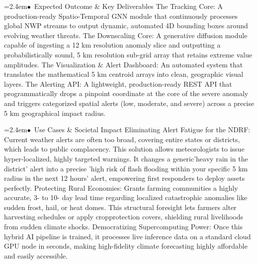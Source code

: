 \documentclass[10pt,a4paper]{article}
\begin{document}
\begin{tcolorbox}[pscard, title={"\textbf{SIH26078} \quad $\vert$ \quad AI-Driven Spatio-Temporal Tracking of Extreme Weather Anomalies in Medium-R...}]
\noindent\hspace*{1.2em}\hangindent=2.4em\textcolor{sihblue}{$\bullet$}~\small Expected Outcome \& Key Deliverables The Tracking Core: A production-ready Spatio-Temporal GNN module that continuously processes global NWP streams to output dynamic, automated 4D bounding boxes around evolving weather threats. The Downscaling Core: A generative diffusion module capable of ingesting a 12 km resolution anomaly slice and outputting a probabilistically sound, 5 km resolution sub-grid array that retains extreme value amplitudes. The Visualization \& Alert Dashboard: An automated system that translates the mathematical 5 km centroid arrays into clean, geographic visual layers. The Alerting API: A lightweight, production-ready REST API that programmatically drops a pinpoint coordinate at the core of the severe anomaly and triggers categorized spatial alerts (low, moderate, and severe) across a precise 5 km geographical impact radius.\par\vspace{0.05cm}
\noindent\hspace*{1.2em}\hangindent=2.4em\textcolor{sihblue}{$\bullet$}~\small Use Cases \& Societal Impact Eliminating Alert Fatigue for the NDRF: Current weather alerts are often too broad, covering entire states or districts, which leads to public complacency. This solution allows meteorologists to issue hyper-localized, highly targeted warnings. It changes a generic'heavy rain in the district' alert into a precise 'high risk of flash flooding within your specific 5 km radius in the next 12 hours' alert, empowering first responders to deploy assets perfectly. Protecting Rural Economies: Grants farming communities a highly accurate, 3- to 10- day lead time regarding localized catastrophic anomalies like sudden frost, hail, or heat domes. This structural foresight lets farmers alter harvesting schedules or apply cropprotection covers, shielding rural livelihoods from sudden climate shocks. Democratizing Supercomputing Power: Once this hybrid AI pipeline is trained, it processes live inference data on a standard cloud GPU node in seconds, making high-fidelity climate forecasting highly affordable and easily accessible.\par\vspace{0.05cm}

\end{tcolorbox}
\vspace{0.4cm}
{}
\end{document}
